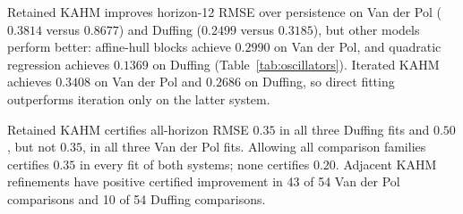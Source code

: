 Retained KAHM improves horizon-12 RMSE over persistence on Van der Pol
($0.3814$ versus $0.8677$) and Duffing ($0.2499$ versus $0.3185$), but other
models perform better: affine-hull blocks achieve $0.2990$ on Van der Pol,
and quadratic regression achieves $0.1369$ on Duffing
(Table~\ref{tab:oscillators}). Iterated KAHM achieves $0.3408$ on Van der Pol
and $0.2686$ on Duffing, so direct fitting outperforms iteration only on the
latter system.

Retained KAHM certifies all-horizon RMSE $0.35$ in all three Duffing fits
and $0.50$, but not $0.35$, in all three Van der Pol fits. Allowing all
comparison families certifies $0.35$ in every fit of both systems; none
certifies $0.20$. Adjacent KAHM refinements have positive certified improvement
in 43 of 54 Van der Pol comparisons and 10 of 54 Duffing comparisons.
